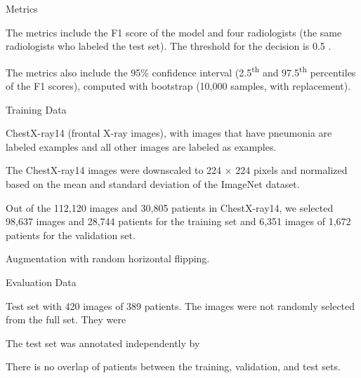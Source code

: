 \documentclass{article}
\begin{document}
\begin{adjustwidth}{-60pt}{-30pt}
\begin{singlespace}
\begin{tcolorbox}[title=\textbf{Model Card - CheXNet},
    breakable, sharp corners, boxrule=0.7pt]
{\begin{mcsection}{Metrics}
    \item The metrics include the F1 score of the model and four radiologists (the same radiologists who labeled the test set). The threshold for the decision is 0.5 \cite{OakdenRayner2018a}.
    \item The metrics also include the 95\% confidence interval (2.5\textsuperscript{th} and 97.5\textsuperscript{th} percentiles of the F1 scores), computed with bootstrap (10,000 samples, with replacement).
    \item {} \cite{Rajpurkar2017}
\end{mcsection}

\begin{mcsection}{Training Data}
    \item ChestX-ray14 (frontal X-ray images), with images that have pneumonia are labeled  examples and all other images are labeled as  examples.
    \item The ChestX-ray14 images were downscaled to 224 $\times$ 224 pixels and normalized based on the mean and standard deviation of the ImageNet dataset.
    \item Out of the 112,120 images and 30,805 patients in ChestX-ray14, we selected 98,637 images and 28,744 patients for the training set and 6,351 images of 1,672 patients for the validation set.
    \item Augmentation with random horizontal flipping.
\end{mcsection}

\pagebreak

\begin{mcsection}{Evaluation Data}
    \item Test set with 420 images of 389 patients. The images were not randomly selected from the full set. They were  \cite{Rajpurkar2018}  \cite{OakdenRayner2018a}
    \item The test set was annotated independently by  \cite{Rajpurkar2017}
    \item There is no overlap of patients between the training, validation, and test sets.
\end{mcsection}

}
\end{tcolorbox}
\end{singlespace}
\end{adjustwidth}
\end{document}
